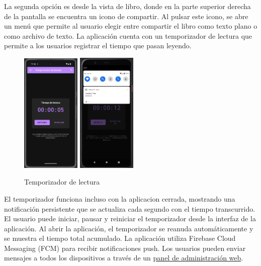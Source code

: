 \documentclass[a4paper,11pt]{report}
\begin{document}
      La segunda opción es desde la vista de libro, donde en la parte superior derecha de la pantalla se encuentra un icono de compartir. Al pulsar este icono, se abre un menú que permite al usuario elegir entre compartir el libro como texto plano o como archivo de texto.
      La aplicación cuenta con un temporizador de lectura que permite a los usuarios registrar el tiempo que pasan leyendo.
      \begin{figure}[H]
        \centering
        \includegraphics[width=0.25\textwidth]{.img/temporizador.png}
        \hspace{2cm}
        \includegraphics[width=0.25\textwidth]{.img/temporizador_2.png}
        \caption{Temporizador de lectura}
        \label{fig:temporizador}
      \end{figure}
      El temporizador funciona incluso con la aplicacion cerrada, mostrando una notificación persistente que se actualiza cada segundo con el tiempo transcurrido.
      El usuario puede iniciar, pausar y reiniciar el temporizador desde la interfaz de la aplicación. Al abrir la aplicación, el temporizador se reanuda automáticamente y se muestra el tiempo total acumulado.
      La aplicación utiliza Firebase Cloud Messaging (FCM) para recibir notificaciones push. Los usuarios pueden enviar mensajes a todos los dispositivos a través de un \textcolor{blue}{\href{http://ec2-51-44-167-78.eu-west-3.compute.amazonaws.com/xgabina001/WEB/admin_panel.php}{panel de administración web}}.
\end{document}
